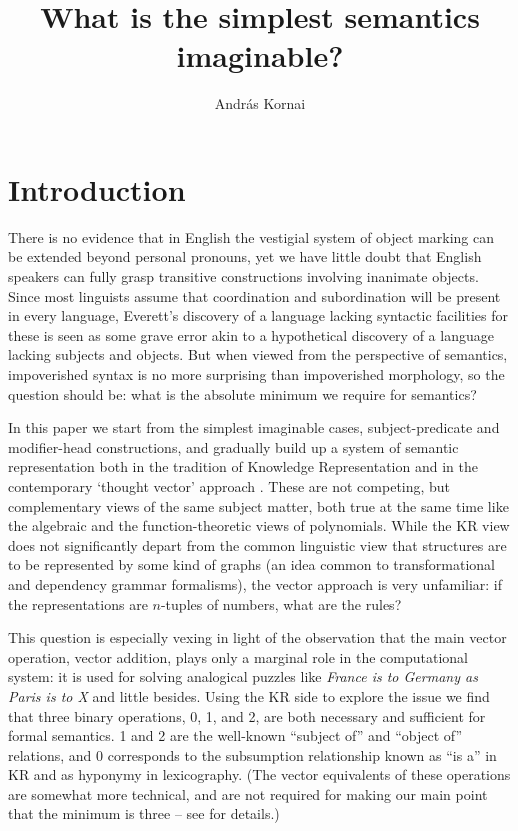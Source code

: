 \documentclass[output=paper,colorlinks=true,citecolor=brown]{langscibook}
\author{Andr\'as Kornai\orcid{0000—0001—6078—6840}\affiliation{Budapest University of Technology and Economics}}
\title{What is the simplest semantics imaginable?}
\begin{document}
\maketitle

\section{Introduction}

There is no evidence that in English the vestigial system of object marking can
be extended beyond personal pronouns, yet we have little doubt that English
speakers can fully grasp transitive constructions involving inanimate
objects. Since most linguists assume that coordination and subordination will
be present in every language, Everett's discovery of a language lacking
syntactic facilities for these is seen as some grave error akin to a
hypothetical discovery of a language lacking subjects and objects. But when
viewed from the perspective of semantics, impoverished syntax is no more
surprising than impoverished morphology, so the question should be: what is
the absolute minimum we require for semantics?

In this paper we start from the simplest imaginable cases, subject-predicate
and modifier-head constructions, and gradually build up a system of semantic
representation both in the tradition of Knowledge Representation
\citep{Brachman:2004} and in the contemporary `thought vector' approach
\citep{LeCun:2015,Kornai:2022}. These are not competing, but complementary
views of the same subject matter, both true at the same time like the
algebraic and the function-theoretic views of polynomials. While the KR view
does not significantly depart from the common linguistic view that
structures are to be represented by some kind of graphs (an idea common to
transformational and dependency grammar formalisms), the vector approach is
very unfamiliar: if the representations are $n$-tuples of numbers, what are
the rules?

This question is especially vexing in light of the observation that the main
vector operation, vector addition, plays only a marginal role in the
computational system: it is used for solving analogical puzzles like \emph{France is to Germany as Paris is to X} \citep{Mikolov:2013l} and little
besides. Using the KR side to explore the issue we find that three binary
operations, 0, 1, and 2, are both necessary and sufficient for formal
semantics. 1 and 2 are the well-known ``subject of'' and ``object of''
relations, and 0 corresponds to the subsumption relationship known as ``is a''
in KR and as hyponymy in lexicography. (The vector equivalents of these
operations are somewhat more technical, and are not required for making our
main point that the minimum is three -- see \citet{Kornai:2022} for details.)
\end{document}
